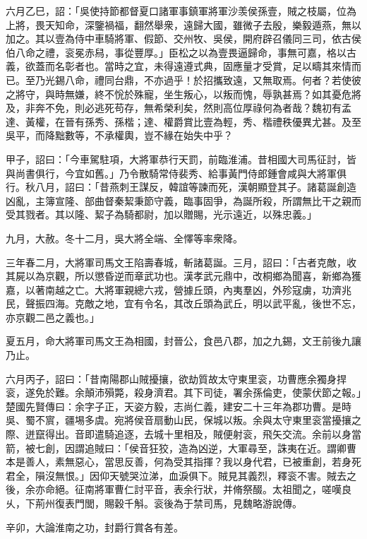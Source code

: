 \begin{pinyinscope}
六月乙巳，詔：「吳使持節都督夏口諸軍事鎮軍將軍沙羡侯孫壹，賊之枝屬，位為上將，畏天知命，深鑒禍福，翻然舉衆，遠歸大國，雖微子去殷，樂毅遁燕，無以加之。其以壹為侍中車騎將軍、假節、交州牧、吳侯，開府辟召儀同三司，依古侯伯八命之禮，衮冕赤舄，事從豐厚。」臣松之以為壹畏逼歸命，事無可嘉，格以古義，欲蓋而名彰者也。當時之宜，未得遠遵式典，固應量才受賞，足以疇其來情而已。至乃光錫八命，禮同台鼎，不亦過乎！於招攜致遠，又無取焉。何者？若使彼之將守，與時無嫌，終不恱於殊寵，坐生叛心，以叛而愧，辱孰甚焉？如其憂危將及，非奔不免，則必逃死苟存，無希榮利矣，然則高位厚祿何為者哉？魏初有孟達、黃權，在晉有孫秀、孫楷；達、權爵賞比壹為輕，秀、楷禮秩優異尤甚。及至吳平，而降黜數等，不承權輿，豈不緣在始失中乎？

甲子，詔曰：「今車駕駐項，大將軍恭行天罰，前臨淮浦。昔相國大司馬征討，皆與尚書俱行，今宜如舊。」乃令散騎常侍裴秀、給事黃門侍郎鍾會咸與大將軍俱行。秋八月，詔曰：「昔燕刺王謀反，韓誼等諫而死，漢朝顯登其子。諸葛誕創造凶亂，主簿宣隆、部曲督秦絜秉節守義，臨事固爭，為誕所殺，所謂無比干之親而受其戮者。其以隆、絜子為騎都尉，加以贈賜，光示遠近，以殊忠義。」

九月，大赦。冬十二月，吳大將全端、全懌等率衆降。

三年春二月，大將軍司馬文王陷壽春城，斬諸葛誕。三月，詔曰：「古者克敵，收其屍以為京觀，所以懲昏逆而章武功也。漢孝武元鼎中，改桐鄉為聞喜，新鄉為獲嘉，以著南越之亡。大將軍親總六戎，營據丘頭，內夷羣凶，外殄寇虜，功濟兆民，聲振四海。克敵之地，宜有令名，其改丘頭為武丘，明以武平亂，後世不忘，亦京觀二邑之義也。」

夏五月，命大將軍司馬文王為相國，封晉公，食邑八郡，加之九錫，文王前後九讓乃止。

六月丙子，詔曰：「昔南陽郡山賊擾攘，欲劫質故太守東里衮，功曹應余獨身捍衮，遂免於難。余顛沛殞斃，殺身濟君。其下司徒，署余孫倫吏，使蒙伏節之報。」楚國先賢傳曰：余字子正，天姿方毅，志尚仁義，建安二十三年為郡功曹。是時吳、蜀不賔，疆埸多虞。宛將侯音扇動山民，保城以叛。余與太守東里衮當擾攘之際、迸竄得出。音即遣騎追逐，去城十里相及，賊便射衮，飛矢交流。余前以身當箭，被七創，因謂追賊曰：「侯音狂狡，造為凶逆，大軍尋至，誅夷在近。謂卿曹本是善人，素無惡心，當思反善，何為受其指揮？我以身代君，已被重創，若身死君全，隕沒無恨。」因仰天號哭泣涕，血淚俱下。賊見其義烈，釋衮不害。賊去之後，余亦命絕。征南將軍曹仁討平音，表余行狀，并脩祭醊。太祖聞之，嗟嘆良乆，下荊州復表門閭，賜穀千斛。衮後為于禁司馬，見魏略游說傳。

辛卯，大論淮南之功，封爵行賞各有差。


\end{pinyinscope}
